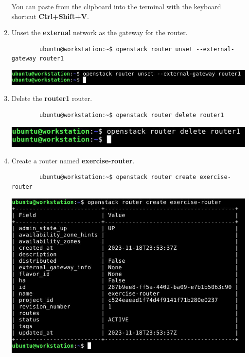 \documentclass[letterpaper, 12pt]{article}
\begin{document}
\begin{enumerate}
    \begin{tipbox}
        You can paste from the clipboard into the terminal with the keyboard shortcut \textbf{Ctrl+Shift+V}.
    \end{tipbox}

    \item Unset the \textbf{external} network as the gateway for the router.
    \begin{lstlisting}
        ubuntu@workstation:~$ openstack router unset --external-gateway router1
    \end{lstlisting}

    \begin{center}
        \includegraphics[width=\linewidth]{images/part2/step11.png}
    \end{center}

    \item Delete the \textbf{router1} router.
    \begin{lstlisting}
        ubuntu@workstation:~$ openstack router delete router1
    \end{lstlisting}

    \begin{center}
        \includegraphics[width=\linewidth]{images/part2/step12.png}
    \end{center}

    \item Create a router named \textbf{exercise-router}.
    \begin{lstlisting}
        ubuntu@workstation:~$ openstack router create exercise-router
    \end{lstlisting}

    \begin{center}
        \includegraphics[width=\linewidth]{images/part2/step13.png}
    \end{center}


\end{enumerate}
\end{document}

